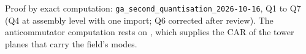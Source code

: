 Proof by exact computation: \texttt{ga\_second\_quantisation\_2026-10-16}, Q1 to Q7 (Q4 at assembly level with one import; Q6 corrected after review). The anticommutator computation rests on , which supplies the CAR of the tower planes that carry the field's modes.
